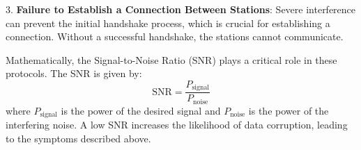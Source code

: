 3. \textbf{Failure to Establish a Connection Between Stations}: Severe interference can prevent the initial handshake process, which is crucial for establishing a connection. Without a successful handshake, the stations cannot communicate.

Mathematically, the Signal-to-Noise Ratio (SNR) plays a critical role in these protocols. The SNR is given by:
\[
\text{SNR} = \frac{P_{\text{signal}}}{P_{\text{noise}}}
\]
where \(P_{\text{signal}}\) is the power of the desired signal and \(P_{\text{noise}}\) is the power of the interfering noise. A low SNR increases the likelihood of data corruption, leading to the symptoms described above.

